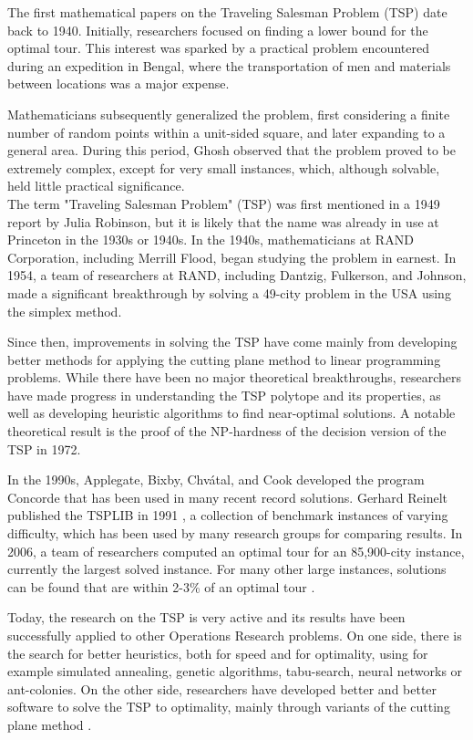 \noindent The first mathematical papers on the Traveling Salesman Problem (TSP) date back to 1940. Initially, researchers focused on finding a lower bound for the optimal tour. This interest was sparked by a practical problem encountered during an expedition in Bengal, where the transportation of men and materials between locations was a major expense.\\

\newpage

\noindent Mathematicians subsequently generalized the problem, first considering a finite number of random points within a unit-sided square, and later expanding to a general area. During this period, Ghosh observed that the problem proved to be extremely complex, except for very small instances, which, although solvable, held little practical significance. \\

\noindent The term "Traveling Salesman Problem" (TSP) was first mentioned in a 1949 report by Julia Robinson, but it is likely that the name was already in use at Princeton in the 1930s or 1940s. In the 1940s, mathematicians at RAND Corporation, including Merrill Flood, began studying the problem in earnest. In 1954, a team of researchers at RAND, including Dantzig, Fulkerson, and Johnson, made a significant breakthrough by solving a 49-city problem in the USA using the simplex method.

Since then, improvements in solving the TSP have come mainly from developing better methods for applying the cutting plane method to linear programming problems. While there have been no major theoretical breakthroughs, researchers have made progress in understanding the TSP polytope and its properties, as well as developing heuristic algorithms to find near-optimal solutions. A notable theoretical result is the proof of the NP-hardness of the decision version of the TSP in 1972.

In the 1990s, Applegate, Bixby, Chvátal, and Cook developed the program Concorde that has been used in many recent record solutions. Gerhard Reinelt published the TSPLIB in 1991 \cite{TSPLIB95}, a collection of benchmark instances of varying difficulty, which has been used by many research groups for comparing results. In 2006, a team of researchers computed an optimal tour for an 85,900-city instance, currently the largest solved instance. For many other large instances, solutions can be found that are within 2-3\% of an optimal tour \cite{wiki:TSP}.

Today, the research on the TSP is very active and its results have been successfully applied to other Operations Research problems. On one side, there is the search for better heuristics, both for speed and for optimality, using for example simulated annealing, genetic algorithms, tabu-search, neural networks or ant-colonies. On the other side, researchers have developed better and better software to solve the TSP to optimality, mainly through variants of the cutting plane method \cite{fortini2007lp}.


